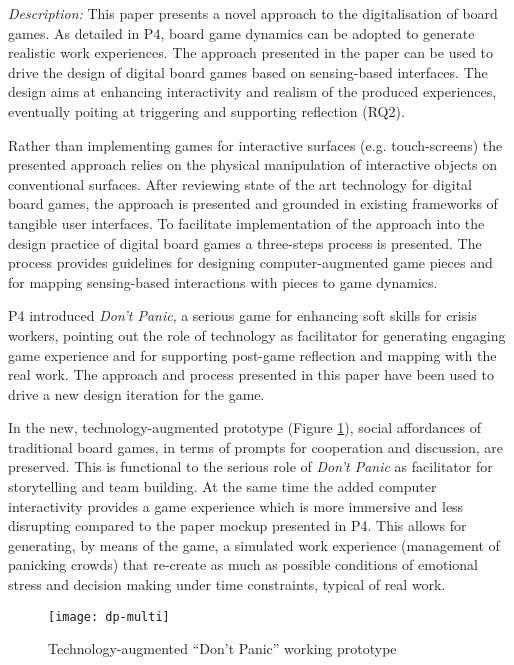 \emph{Description:} This paper presents a novel approach to the digitalisation of board games. As detailed in P4, board game dynamics can be adopted to generate realistic work experiences. The approach presented in the paper can be used to drive the design of digital board games based on sensing-based interfaces. The design aims at enhancing interactivity and realism of the produced experiences, eventually poiting at triggering and supporting reflection (RQ2).

Rather than implementing games for interactive surfaces (e.g. touch-screens) the presented approach relies on the physical manipulation of interactive objects on conventional surfaces. After reviewing state of the art technology for digital board games, the approach is presented and grounded in existing frameworks of tangible user interfaces. To facilitate implementation of the approach into the design practice of digital board games a three-steps process is presented. The process provides guidelines for designing computer-augmented game pieces and for mapping sensing-based interactions with pieces to game dynamics.

P4 introduced \emph{Don't Panic}, a serious game for enhancing soft skills for crisis workers, pointing out the role of technology as facilitator for generating engaging game experience and for supporting post-game reflection and mapping with the real work. The approach and process presented in this paper have been used to drive a new design iteration for the game. 

In the new, technology-augmented prototype (Figure \ref{fig:dp-token}), social affordances of traditional board games, in terms of prompts for cooperation and discussion, are preserved. This is functional to the serious role of \emph{Don't Panic} as facilitator for storytelling and team building. At the same time the added computer interactivity provides a game experience which is more immersive and less disrupting compared to the paper mockup presented in P4. This allows for generating, by means of the game, a simulated work experience (management of panicking crowds) that re-create as much as possible conditions of emotional stress and decision making under time constraints, typical of real work. 

\begin{figure}
	[tbh] \centering 
	\texttt{[image: dp-multi]} \caption{Technology-augmented “Don't Panic” working prototype} \label{fig:dp-token} 
\end{figure}

